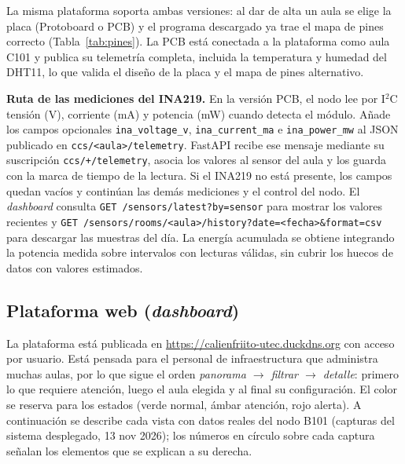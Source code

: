 \documentclass[10pt,a4paper]{article}
\newcommand{\cod}[1]{\texttt{\small #1}}
\begin{document}
La misma plataforma soporta ambas versiones: al dar de alta un aula se elige la placa (Protoboard o PCB) y el programa descargado ya trae el mapa de pines correcto (Tabla~\ref{tab:pines}). La PCB está conectada a la plataforma como aula C101 y publica su telemetría completa, incluida la temperatura y humedad del DHT11, lo que valida el diseño de la placa y el mapa de pines alternativo.

\textbf{Ruta de las mediciones del INA219.} En la versión PCB, el nodo lee por I$^2$C tensión (V), corriente (mA) y potencia (mW) cuando detecta el módulo. Añade los campos opcionales \cod{ina\_voltage\_v}, \cod{ina\_current\_ma} e \cod{ina\_power\_mw} al JSON publicado en \cod{ccs/<aula>/telemetry}. FastAPI recibe ese mensaje mediante su suscripción \cod{ccs/+/telemetry}, asocia los valores al sensor del aula y los guarda con la marca de tiempo de la lectura. Si el INA219 no está presente, los campos quedan vacíos y continúan las demás mediciones y el control del nodo. El \emph{dashboard} consulta \cod{GET /sensors/latest?by=sensor} para mostrar los valores recientes y \cod{GET /sensors/rooms/<aula>/history?date=<fecha>\&format=csv} para descargar las muestras del día. La energía acumulada se obtiene integrando la potencia medida sobre intervalos con lecturas válidas, sin cubrir los huecos de datos con valores estimados.

\subsection{Plataforma web (\emph{dashboard})}
\label{sec:dashboard}
La plataforma está publicada en \url{https://calienfriito-utec.duckdns.org} con acceso por usuario. Está pensada para el personal de infraestructura que administra muchas aulas, por lo que sigue el orden \emph{panorama $\rightarrow$ filtrar $\rightarrow$ detalle}: primero lo que requiere atención, luego el aula elegida y al final su configuración. El color se reserva para los estados (verde normal, ámbar atención, rojo alerta). A continuación se describe cada vista con datos reales del nodo B101 (capturas del sistema desplegado, 13 nov 2026); los números en círculo sobre cada captura señalan los elementos que se explican a su derecha.
\end{document}
